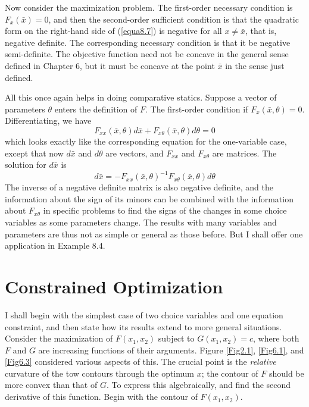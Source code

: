 Now consider the maximization problem. The first-order necessary condition is $F_x(\bar{x})=0$, and then the second-order sufficient condition is that the quadratic form on the right-hand side of (\ref{equa8.7}) is negative for all $x \neq \bar{x}$, that is, negative definite. The corresponding necessary condition is that it be negative semi-definite. The objective function need not be concave in the general sense defined in Chapter 6, but it must be concave at the point $\bar{x}$ in the sense just defined.

All this once again helps in doing comparative statics. Suppose a vector of parameters $\theta$ enters the definition of $F$. The first-order condition if $F_x(\bar{x}, \theta)=0$. Differentiating, we have
\begin{equation*}
F_{xx}(\bar{x}, \theta) d\bar{x} + F_{x\theta}(\bar{x}, \theta) d\theta =0
\end{equation*}
which looks exactly like the corresponding equation for the one-variable case, except that now $d\bar{x}$ and $d\theta$ are vectors, and $F_{xx}$ and $F_{x\theta}$ are matrices. The solution for $d\bar{x}$ is 
\begin{equation} \label{equa8.9}
d\bar{x} =- F_{xx}(\bar{x}, \theta)^{-1} F_{x\theta}(\bar{x}, \theta)d\theta
\end{equation}
The inverse of a negative definite matrix is also negative definite, and the information about the sign of its minors can be combined with the information about $F_{x\theta}$ in specific problems to find the signs of the changes in some choice variables as some parameters change. The results with many variables and parameters are thus not as simple or general as those before. But I shall offer one application in Example 8.4.

\section*{Constrained Optimization}

I shall begin with the simplest case of two choice variables and one equation constraint, and then state how its results extend to more general situations. Consider the maximization of $F(x_1, x_2)$ subject to $G(x_1, x_2) =c$, where both $F$ and $G$ are increasing functions of their arguments. Figure \ref{Fig2.1}, \ref{Fig6.1}, and \ref{Fig6.3} considered various aspects of this. The crucial point is the \textit{relative} curvature of the tow contours through the optimum $x$; the contour of $F$ should be more convex than that of $G$. To express this algebraically, and find the second derivative of this function. Begin with the contour of $F(x_1, x_2)$.

